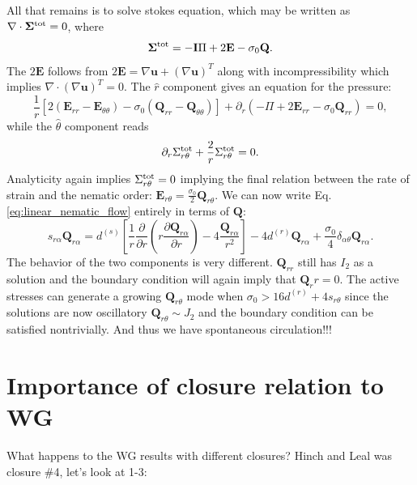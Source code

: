 \documentclass[onecolumn,showpacs,preprintnumbers,prl,amsmath,amssymb]{revtex4-1}
\def\b{\mathbf}
\begin{document}
All that remains is to solve stokes equation, which may be written as $\nabla\cdot\b{\Sigma}^{\rm tot}=0$, where
\begin{equation}
\b{\Sigma}^{\rm tot}=-\b{I}\Pi+2\b{E}-\sigma_0\b{Q}.
\end{equation}
The $2\b{E}$ follows from $2\b{E}=\nabla\b{u}+(\nabla\b{u})^T$ along with incompressibility which implies $\nabla\cdot(\nabla\b{u})^T=0$.  The $\hat{r}$ component gives an equation for the pressure:
\begin{equation}
\frac{1}{r}\left[2(\b{E}_{rr}-\b{E}_{\theta\theta})-\sigma_0(\b{Q}_{rr}-\b{Q}_{\theta\theta})\right]+\partial_r(-\Pi+2\b{E}_{rr}-\sigma_0\b{Q}_{rr})=0,
\end{equation}
while the $\hat{\theta}$ component reads
\begin{equation}
\partial_r\Sigma^{\rm tot}_{r\theta}+\frac{2}{r}\Sigma^{\rm tot}_{r\theta}=0.
\end{equation}
Analyticity again implies $\Sigma^{\rm tot}_{r\theta}=0$ implying the final relation between the rate of strain and the nematic order: $\b{E}_{r\theta}=\frac{\sigma_0}{2}\b{Q}_{r\theta}$.  We can now write Eq. \ref{eq:linear_nematic_flow} entirely in terms of $\b{Q}$:
\begin{equation}
s_{r\alpha}\b{Q}_{r\alpha}=d^{(s)}\left[\frac{1}{r}\frac{\partial}{\partial r}\left(r\frac{\partial\b{Q}_{r\alpha}}{\partial r}\right)-4\frac{\b{Q}_{r\alpha}}{r^2}\right]-4d^{(r)}\b{Q}_{r\alpha}+\frac{\sigma_0}{4}\delta_{\alpha\theta}\b{Q}_{r\alpha}.
\end{equation}
The behavior of the two components is very different. $\b{Q}_{rr}$ still has $I_2$ as a solution and the boundary condition will again imply that $\b{Q}_rr=0$.  The active stresses can generate a growing $\b{Q}_{r\theta}$ mode when $\sigma_0>16d^{(r)}+4s_{r\theta}$ since the solutions are now oscillatory $\b{Q}_{r\theta}\sim J_2$ and the boundary condition can be satisfied nontrivially. And thus we have spontaneous circulation!!! 








\section{Importance of closure relation to WG}
What happens to the WG results with different closures?  Hinch and Leal was closure \#4, let's look at 1-3:
\end{document}
